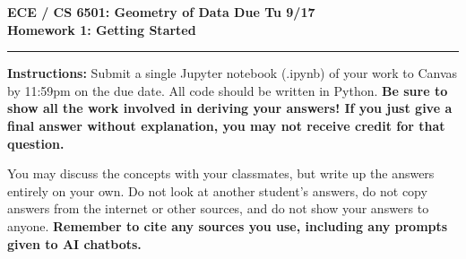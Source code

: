 \documentclass[11pt]{article}
\begin{document}
\thispagestyle{empty}
{\large{\bf ECE / CS 6501: Geometry of Data \hfill Due Tu 9/17}}\\

{\LARGE{\bf Homework 1: Getting Started }}
\vspace{0.2\baselineskip}
\hrule

{\bf Instructions:} Submit a single Jupyter notebook (.ipynb) of your work to
Canvas by 11:59pm on the due date. All code should be written in Python. {\bf Be
  sure to show all the work involved in deriving your answers! If you just give
  a final answer without explanation, you may not receive credit for that
  question.}

You may discuss the concepts with your classmates, but write up the answers
entirely on your own. Do not look at another student's answers, do not copy
answers from the internet or other sources, and do not show your answers to
anyone. {\bf Remember to cite any sources you use, including any prompts given
  to AI chatbots.}
\end{document}
